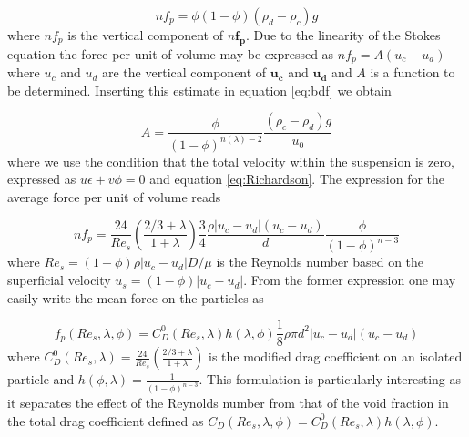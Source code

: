 \begin{equation}
nf_p = \phi(1-\phi)(\rho_d -\rho _c)g
\label{eq:bdf}
\end{equation}
where $nf_p$ is the vertical component of $n\mathbf{f_p}$. Due to the linearity of the Stokes equation the force per unit of volume may be expressed as $nf_p = A (u_c -u_d)$ where $u_c$ and $u_d$ are the vertical component of $\mathbf{u_c}$ and $\mathbf{u_d}$ and $A$ is a function to be determined. Inserting this estimate in equation \ref{eq:bdf} we obtain 

\begin{equation}
A = \frac{\phi}{(1-\phi)^{n(\lambda)-2}} \frac{(\rho_c -\rho_d)g}{u_0} 
\end{equation}
where we use the condition that the total velocity within the suspension is zero, expressed as $u\epsilon + v\phi=0$ and equation \ref{eq:Richardson}. The expression for the average force per unit of volume reads %



\begin{equation}
nf_p = \frac{24}{Re_s}\left(\frac{2/3+\lambda}{1+\lambda}\right)\frac{3}{4}\frac{\rho |u_c-u_d|(u_c-u_d)}{d}\frac{\phi}{(1-\phi)^{n-3}}
\end{equation}
where $Re_s = (1-\phi)\rho |u_c-u_d| D/\mu$ is the Reynolds number based on the superficial velocity $u_s=(1-\phi) |u_c-u_d|$. From the former expression one may easily write the mean force on the particles as

\begin{equation}
f_p (Re_s,\lambda,\phi) = C_D^0(Re_s,\lambda)h(\lambda,\phi)\frac{1}{8}\rho \pi d^2 |u_c-u_d|(u_c-u_d)
\label{eq:FCD}
\end{equation}
where $C_D^0(Re_s,\lambda)=\frac{24}{Re_s}\left(\frac{2/3+\lambda}{1+\lambda}\right)$ is the modified drag coefficient on an isolated particle and $h(\phi,\lambda) =\frac{1}{(1-\phi)^{n-3}}$. This formulation is particularly interesting as it separates the effect of the Reynolds number from that of the void fraction in the total drag coefficient defined as $C_D(Re_s,\lambda,\phi) = C_D^0(Re_s,\lambda)h(\lambda,\phi)$. 

